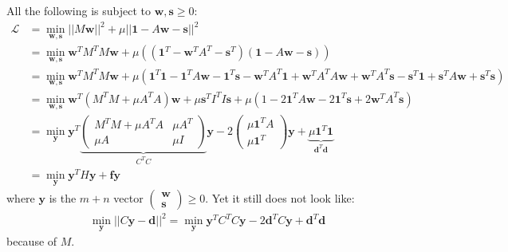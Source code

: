 \documentclass[a4paper,final,11pt]{article}
\newcommand{\bm}[1]{\boldsymbol{#1}}
\begin{document}
	All the following is subject to $\bm{w},\bm{s}\geq0$:
\begin{align*}
\mathcal{L} &= \min_{\bm{w},\bm{s}} ||M\bm{w}||^2 + \mu||\mathbf{\bm{1}} - A\bm{w} - \bm{s}||^2 \\
	    &= \min_{\bm{w},\bm{s}} \bm{w}^TM^TM\bm{w} + \mu\left( (\bm{1}^T -\bm{w}^TA^T -\bm{s}^T)(\bm{1} - A\bm{w} - \bm{s})\right)\\
	    &= \min_{\bm{w},\bm{s}} \bm{w}^TM^TM\bm{w} + \mu\left( \bm{1}^T\bm{1} - \bm{1}^TA\bm{w} - \bm{1}^T\bm{s} -\bm{w}^TA^T\bm{1} +\bm{w}^TA^TA\bm{w} +\bm{w}^TA^T\bm{s}-\bm{s}^T\bm{1} +\bm{s}^T A\bm{w} +\bm{s}^T \bm{s}\right)\\
	    &= \min_{\bm{w},\bm{s}} \bm{w}^T(M^TM+\mu A^TA)\bm{w} +\mu \bm{s}^TI^TI\bm{s} +
	    \mu\left( 1 - 2 \bm{1}^TA\bm{w} - 2 \bm{1}^T\bm{s} +2\bm{w}^TA^T\bm{s}\right)\\
	    &= \min_{\bm{y}} \bm{y}^T
\underbrace{\begin{pmatrix}
M^TM+\mu A^TA & \mu A^T \\
\mu A & \mu I
\end{pmatrix}}_{C^TC}\bm{y} -2\begin{pmatrix}
\mu \bm{1}^TA \\
\mu \bm{1}^T
\end{pmatrix}\bm{y}
+\underbrace{\mu\bm{1}^T\bm{1}}_{\bm{d}^T\bm{d}}\\
&= \min_{\bm{y}} \bm{y}^T H \bm{y} + \bm{f}\bm{y}
\end{align*}
where $\bm{y}$ is the $m+n$ vector 
$
\begin{pmatrix}
	\bm{w}\\
	\bm{s}
\end{pmatrix}\geq0$. Yet it still does not look like:
\begin{align*}
\min_{\bm{y}} ||C\bm{y} - \bm{d} ||^2 = \min_{\bm{y}} \bm{y}^TC^TC\bm{y} - 2\bm{d}^TC\bm{y} + \bm{d}^T\bm{d}
\end{align*}
because of $M$.

\begin{center}




\end{center}
\end{document}
